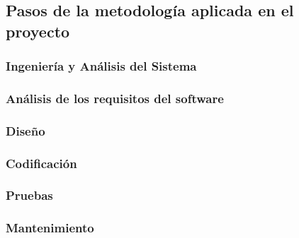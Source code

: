     \subsection{Pasos de la metodología aplicada en el proyecto}
          \subsubsection{Ingeniería y Análisis del Sistema}
          \subsubsection{Análisis de los requisitos del software}
          \subsubsection{Diseño}
          \subsubsection{Codificación}
          \subsubsection{Pruebas}
          \subsubsection{Mantenimiento}
